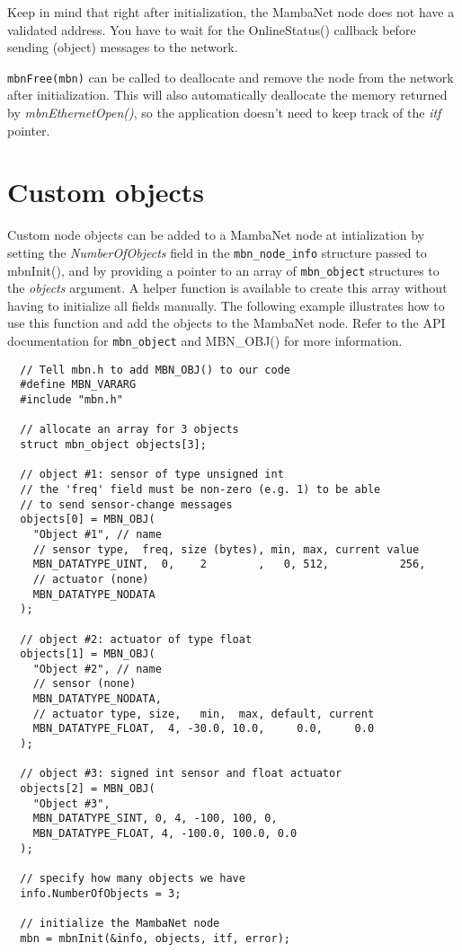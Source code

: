 Keep in mind that right after initialization, the MambaNet node does not have a validated address. You have to wait for the OnlineStatus() callback before sending (object) messages to the network.

\verb|mbnFree(mbn)| can be called to deallocate and remove the node from the network after initialization. This will also automatically deallocate the memory returned by \textit{mbnEthernetOpen()}, so the application doesn't need to keep track of the \textit{itf} pointer.




\section{Custom objects}
Custom node objects can be added to a MambaNet node at intialization by setting the \textit{NumberOfObjects} field in the \verb|mbn_node_info| structure passed to mbnInit(), and by providing a pointer to an array of \verb|mbn_object| structures to the \textit{objects} argument. A helper function is available to create this array without having to initialize all fields manually. The following example illustrates how to use this function and add the objects to the MambaNet node. Refer to the API documentation for \verb|mbn_object| and MBN\_OBJ() for more information.
\begin{verbatim}
  // Tell mbn.h to add MBN_OBJ() to our code
  #define MBN_VARARG
  #include "mbn.h"

  // allocate an array for 3 objects
  struct mbn_object objects[3];

  // object #1: sensor of type unsigned int
  // the 'freq' field must be non-zero (e.g. 1) to be able
  // to send sensor-change messages
  objects[0] = MBN_OBJ(
    "Object #1", // name
    // sensor type,  freq, size (bytes), min, max, current value
    MBN_DATATYPE_UINT,  0,    2        ,   0, 512,           256,
    // actuator (none)
    MBN_DATATYPE_NODATA
  );

  // object #2: actuator of type float
  objects[1] = MBN_OBJ(
    "Object #2", // name
    // sensor (none)
    MBN_DATATYPE_NODATA,
    // actuator type, size,   min,  max, default, current
    MBN_DATATYPE_FLOAT,  4, -30.0, 10.0,     0.0,     0.0
  );

  // object #3: signed int sensor and float actuator
  objects[2] = MBN_OBJ(
    "Object #3",
    MBN_DATATYPE_SINT, 0, 4, -100, 100, 0,
    MBN_DATATYPE_FLOAT, 4, -100.0, 100.0, 0.0
  );

  // specify how many objects we have
  info.NumberOfObjects = 3;

  // initialize the MambaNet node
  mbn = mbnInit(&info, objects, itf, error);
\end{verbatim}

